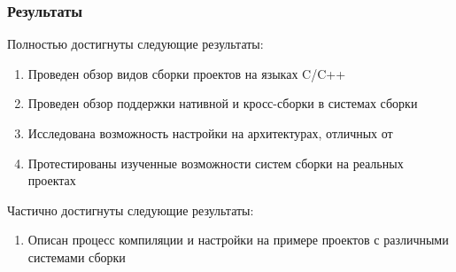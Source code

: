 \documentclass[aspectratio=169]{beamer}
\begin{document}
\begin{frame}
	\frametitle{Результаты}
	Полностью достигнуты следующие результаты:
	\begin{enumerate}
		\item Проведен обзор видов сборки проектов на языках \textsc{C}/\textsc{C++}
		\item Проведен обзор поддержки нативной и кросс-сборки в системах сборки
		\item Исследована возможность настройки \ci{} на архитектурах, отличных от \amd{}
		\item Протестированы изученные возможности систем сборки на реальных проектах
	\end{enumerate}
	Частично достигнуты следующие результаты:
	\begin{enumerate}
		\item Описан процесс компиляции и настройки \ci{} на примере проектов с различными системами сборки
	\end{enumerate}

\end{frame}
\end{document}
